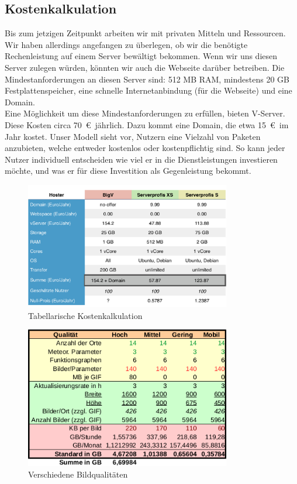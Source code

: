 \documentclass[a4paper,oneside,12pt,titlepage]{article}
\begin{document}
    \subsection{Kostenkalkulation}
        Bis zum jetzigen Zeitpunkt arbeiten wir mit privaten Mitteln und Ressourcen. Wir haben allerdings angefangen zu überlegen, ob wir die benötigte Rechenleistung auf einem Server bewältigt bekommen. Wenn wir uns diesen Server zulegen würden, könnten wir auch die Webseite darüber betreiben. Die Mindestanforderungen an diesen Server sind: 512 MB RAM, mindestens 20 GB Festplattenspeicher, eine schnelle Internetanbindung (für die Webseite) und eine Domain.\\ Eine Möglichkeit um diese Mindestanforderungen zu erfüllen, bieten V-Server. Diese Kosten circa 70\mbox{ }\euro   \mbox{ }jährlich. Dazu kommt eine Domain, die etwa 15\mbox{ }\euro \mbox{ }im Jahr kostet. Unser Modell sieht vor, Nutzern eine Vielzahl von Paketen anzubieten, welche entweder kostenlos oder kostenpflichtig sind. So kann jeder Nutzer individuell entscheiden wie viel er in die Dienstleistungen investieren möchte, und was er für diese Investition als Gegenleistung bekommt. 

\begin{figure}[hbp] 
  \centering
     \includegraphics[width=0.8\textwidth]{kostencalc.png}
  \caption{Tabellarische Kostenkalkulation}
\end{figure}

\begin{figure}[hbp] 
  \centering
     \includegraphics[width=0.8\textwidth]{nutzung.png}
  \caption{Verschiedene Bildqualitäten}
\end{figure}
\end{document}
